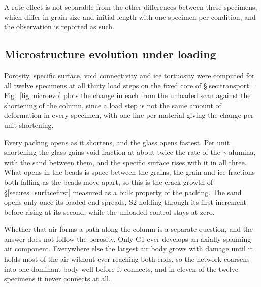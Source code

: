 \documentclass[preprint,12pt,numbers]{elsarticle}
\begin{document}
  A rate effect is not separable from the other differences between these
  specimens, which differ in grain size and initial length with one specimen
  per condition, and the observation is reported as such.

  \subsection{Microstructure evolution under loading}
  \label{sec:res_evolution}
  Porosity, specific surface, void connectivity and ice tortuosity were
  computed for all twelve specimens at all thirty load steps on the fixed core
  of \S\ref{sec:transport}.  Fig.~\ref{fig:microevo} plots the change in each
  from the unloaded scan against the shortening of the column, since a load
  step is not the same amount of deformation in every specimen, with one line
  per material giving the change per unit shortening.

  Every packing opens as it shortens, and the glass opens fastest.  Per unit
  shortening the glass gains void fraction at about twice the rate of the
  $\gamma$-alumina, with the sand between them, and the specific surface
  rises with it in all three.  What opens in the beads is space between the
  grains, the grain and ice fractions both falling as the beads move apart,
  so this is the crack growth of \S\ref{sec:res_surfacefirst} measured as a
  bulk property of the packing.  The sand opens only once its loaded end
  spreads, S2 holding through its first increment before rising at its
  second, while the unloaded control stays at zero.

  Whether that air forms a path along the column is a separate question, and
  the answer does not follow the porosity.  Only G1 ever develops an axially
  spanning air component.  Everywhere else the largest air body grows with
  damage until it holds most of the air without ever reaching both ends, so
  the network coarsens into one dominant body well before it connects, and in
  eleven of the twelve specimens it never connects at all.
\end{document}
